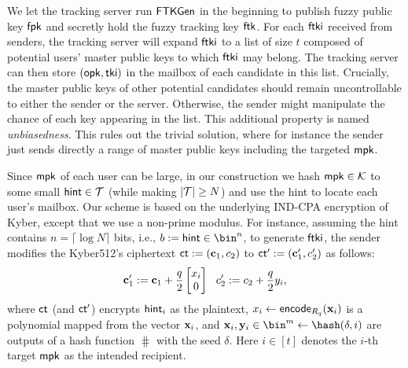 We let the tracking server run $\mathsf{FTKGen}$ in the beginning to publish fuzzy public key $\mathsf{fpk}$ and secretly hold the fuzzy tracking key $\mathsf{ftk}$.
For each $\mathsf{ftki}$ received from senders, the tracking server will expand $\mathsf{ftki}$ to a list of size $t$ composed of potential users' master public keys to which $\mathsf{ftki}$ may belong. The tracking server can then store $(\mathsf{opk},\mathsf{tki})$ in the mailbox of each candidate in this list. Crucially, the master public keys of other potential candidates should remain uncontrollable to either the sender or the server. Otherwise, the sender might manipulate the chance of each key appearing in the list. This additional property is named \emph{unbiasedness}. This rules out the trivial solution, where for instance the sender just sends directly a range of master public keys including the targeted $\mathsf{mpk}$.
 
Since $\mathsf{mpk}$ of each user can be large, in our construction we hash $\mathsf{mpk}\in\mathcal{K}$ to some small $\mathsf{hint}\in\mathcal{T}$ (while making $|\mathcal{T}|\ge N$) and use the hint to locate each user's mailbox. Our scheme is based on the underlying IND-CPA encryption of Kyber, except that we use a non-prime modulus.
For instance, assuming the hint contains $n=\lceil\log N\rceil$ bits, i.e., $b:=\hint\in\bin^n$, to generate $\mathsf{ftki}$, the sender modifies the Kyber512's ciphertext $\mathsf{ct}:=(\mathbf{c}_1,c_2)$ to $\mathsf{ct}':=(\mathbf{c}'_1,c'_2)$ as follows:
$$\cn'_1:=\cn_1+\frac{q}{2}\begin{bmatrix}x_i\\0\end{bmatrix}\ \  c'_2:=c_2+\frac{q}{2}y_i,
$$
where $\mathsf{ct}$ (and $\mathsf{ct}'$) encrypts $\mathsf{hint}_i$ as the plaintext, $x_i\gets\mathsf{encode}_{R_{q}}(\mathbf{x}_i)$ is a polynomial mapped from the vector $\mathbf{x}_i$, and $\xn_i,\yn_i\in\bin^m\gets\hash(\delta,i)$ are outputs of a hash function $\hash$ with the seed $\delta$. Here $i\in [t]$ denotes the $i$-th target $\mathsf{mpk}$ as the intended recipient.


